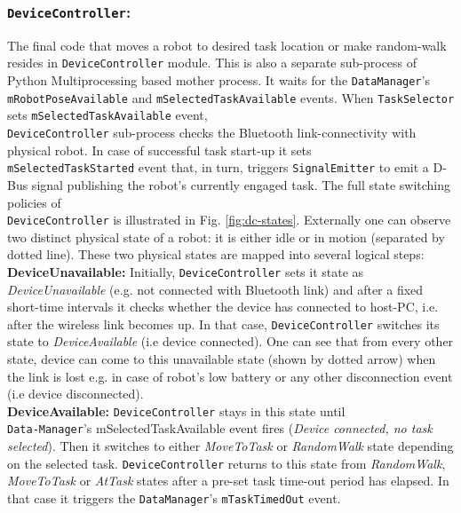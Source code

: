 \subsubsection*{\texttt{DeviceController}:}
\label{afm:impl:dc}
The final code that moves a robot to desired task location or make random-walk resides in \texttt{DeviceController} module. This is also a separate sub-process of Python Multiprocessing based mother process. It waits for the \texttt{DataManager}'s \texttt{mRobotPoseAvailable} and \texttt{mSelectedTaskAvailable} events. When \texttt{TaskSelector} sets  \texttt{mSelectedTaskAvailable} event,\\ \texttt{DeviceController} sub-process checks the Bluetooth link-connectivity with physical robot. In case of successful task start-up it sets\\ \texttt{mSelectedTaskStarted} event that, in turn, triggers \texttt{SignalEmitter} to emit a D-Bus signal publishing the robot's currently engaged task. The full state switching policies of\\ \texttt{DeviceController} is illustrated in Fig. \ref{fig:dc-states}. Externally one can observe two distinct physical state of a robot: it is either idle or in motion (separated by dotted line). These two physical states are mapped into several logical steps:\\
\textbf{DeviceUnavailable: }
Initially, \texttt{DeviceController} sets it state as \textit{DeviceUnavailable} (e.g. not connected with Bluetooth link) and after a fixed short-time intervals it checks whether the device has connected to host-PC, i.e. after the  wireless link becomes up. In that case, \texttt{DeviceController} switches its state to \textit{DeviceAvailable} (i.e device connected). One can see that from every other state, device can come to this unavailable state (shown by dotted arrow) when the  link is lost e.g. in case of robot's low battery or any other disconnection event (i.e device disconnected).\\
\textbf{DeviceAvailable: }
\texttt{DeviceController} stays in this state until\\ \texttt{Data-Manager}'s mSelectedTaskAvailable event fires ({\em Device connected, no task selected}). Then it switches to either \textit{MoveToTask} or \textit{RandomWalk} state depending on the selected task.  \texttt{DeviceController}  returns to this state from \textit{RandomWalk}, \textit{MoveToTask} or \textit{AtTask} states after a pre-set task time-out period has elapsed.  In that case it triggers the \texttt{DataManager}'s \texttt{mTaskTimedOut} event.\\
